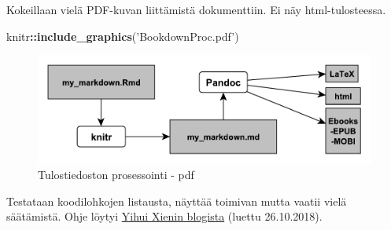 \documentclass[finnish,]{book}
\newenvironment{Shaded}{\begin{snugshade}}{\end{snugshade}}
\newcommand{\KeywordTok}[1]{\textcolor[rgb]{0.13,0.29,0.53}{\textbf{#1}}}
\newcommand{\NormalTok}[1]{#1}
\newcommand{\OperatorTok}[1]{\textcolor[rgb]{0.81,0.36,0.00}{\textbf{#1}}}
\newcommand{\StringTok}[1]{\textcolor[rgb]{0.31,0.60,0.02}{#1}}
\begin{document}
Kokeillaan vielä PDF-kuvan liittämistä dokumenttiin. Ei näy html-tulosteessa.

\begin{Shaded}
\begin{Highlighting}[]
\NormalTok{knitr}\OperatorTok{::}\KeywordTok{include_graphics}\NormalTok{(}\StringTok{'BookdownProc.pdf'}\NormalTok{)}
\end{Highlighting}
\end{Shaded}

\begin{figure}

{\centering \includegraphics[width=0.5\linewidth]{BookdownProc} 

}

\caption{Tulostiedoston prosessointi - pdf}\label{fig:bdprocess2}
\end{figure}

Testataan koodilohkojen listausta, näyttää toimivan mutta vaatii vielä säätämistä. Ohje löytyi \href{https://yihui.name/en/2018/09/code-appendix/}{Yihui Xienin blogista} (luettu 26.10.2018).
\end{document}
